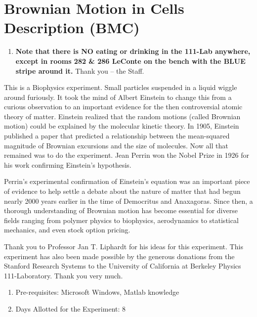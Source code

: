 \documentclass{../lab}
\begin{document}
\maketitle

\tableofcontents

\section{Brownian Motion in Cells Description (BMC)}

\begin{enumerate}
    \item \textbf{Note that there is NO eating or drinking in the 111-Lab anywhere, except in rooms 282 \& 286 LeConte on the bench with the BLUE stripe around it.} Thank you -- the Staff.
\end{enumerate}

This is a Biophysics experiment. Small particles suspended in a liquid wiggle around furiously. It took the mind of Albert Einstein to change this from a curious observation to an important evidence for the then controversial atomic theory of matter. Einstein realized that the random motions (called Brownian motion) could be explained by the molecular kinetic theory. In 1905, Einstein published a paper that predicted a relationship between the mean-squared magnitude of Brownian excursions and the size of molecules. Now all that remained was to do the experiment. Jean Perrin won the Nobel Prize in 1926 for his work confirming Einstein's hypothesis.

Perrin's experimental confirmation of Einstein's equation was an important piece of evidence to help settle a debate about the nature of matter that had begun nearly 2000 years earlier in the time of Democritus and Anaxagoras. Since then, a thorough understanding of Brownian motion has become essential for diverse fields ranging from polymer physics to biophysics, aerodynamics to statistical mechanics, and even stock option pricing.

Thank you to Professor Jan T. Liphardt for his ideas for this experiment. This experiment has also been made possible by the generous donations from the Stanford Research Systems to the University of California at Berkeley Physics 111-Laboratory. Thank you very much.

\begin{enumerate}
    \item Pre-requisites: Microsoft Windows, Matlab knowledge

    \item Days Allotted for the Experiment: 8
\end{enumerate}
\end{document}
